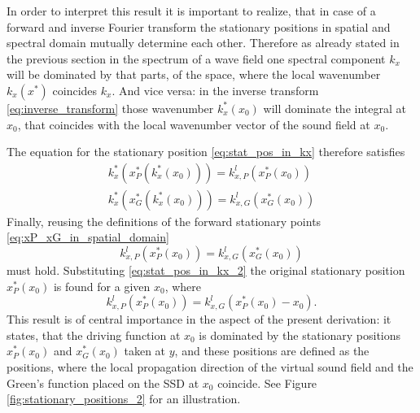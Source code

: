 \documentclass[12pt,a4paper]{article}
\begin{document}
In order to interpret this result it is important to realize, that in case of a forward and inverse Fourier transform the stationary positions in spatial and spectral domain mutually determine each other.
Therefore as already stated in the previous section in the spectrum of a wave field one spectral component $k_x$ will be dominated by that parts, of the space, where the local wavenumber $k_x(x^*)$ coincides $k_x$.
And vice versa: in the inverse transform \eqref{eq:inverse_transform} those wavenumber $k_x^*(x_0)$ will dominate the integral at $x_0$, that coincides with the local wavenumber vector of the sound field at $x_0$. 

The equation for the stationary position \eqref{eq:stat_pos_in_kx} therefore satisfies
\begin{eqnarray}
k_x^*(x^*_P(k_x^*(x_0))) = k^l_{x,P}(x^*_P(x_0)) \\
k_x^*(x^*_G(k_x^*(x_0))) = k^l_{x,G}(x^*_G(x_0))
\end{eqnarray}
Finally, reusing the definitions of the forward stationary points \eqref{eq:xP_xG_in_spatial_domain}
\begin{equation} 
k^l_{x,P}(x^*_P(x_0)) = k^l_{x,G}(x^*_G(x_0))
\end{equation}
must hold.
Substituting \eqref{eq:stat_pos_in_kx_2} the original stationary position $x^*_P(x_0)$ is found for a given $x_0$, where 
\begin{equation}
k^l_{x,P}(x^*_P(x_0)) = k^l_{x,G}(x^*_P(x_0) - x_0).
\end{equation}
This result is of central importance in the aspect of the present derivation: it states, that the driving function at $x_0$ is dominated by the stationary positions $x^*_P(x_0)$ and $x^*_G(x_0)$ taken at $y$, and these positions are defined as the positions, where the local propagation direction of the virtual sound field and the Green's function placed on the SSD at $x_0$ coincide.
See Figure \ref{fig:stationary_positions_2} for an illustration.
\end{document}
